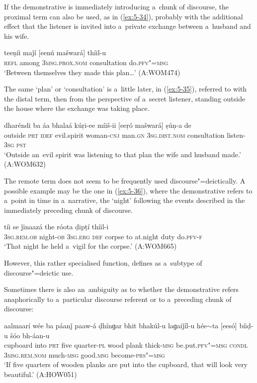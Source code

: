 If the demonstrative is immediately introducing a~chunk of discourse, the proximal term can also be used, as in (\ref{ex:5-34}), probably with the additional effect that the listener is invited into a~private exchange between a~husband and his wife.
\begin{exe}
\ex
\label{ex:5-34}
\gll teeṇíi maǰí [eenú mašwará] thíil-u \\
\textsc{refl} among \textsc{3msg}.\textsc{prox.nom} consultation do.\textsc{pfv"=msg}\\
\glt `Between themselves they made this plan{\ldots}' (A:WOM474)
\end{exe}
The same `plan' or `consultation' is a~little later, in (\ref{ex:5-35}), referred to with the distal term, then from the perspective of a~secret listener, standing outside the house where the exchange was taking place.
\begin{exe}
\ex
\label{ex:5-35}
\gll dharéndi ba áa bhalaá kúṛi-ee míiš-ii [eeṛó mašwará] ṣúṇ-a de \\
outside \textsc{prt} \textsc{idef} evil.spirit woman-\textsc{cnj} man.\textsc{gn} \textsc{3sg.dist.nom} consultation listen-\textsc{3sg} \textsc{pst} \\
\glt `Outside an~evil spirit was listening to that plan the wife and husband made.' (A:WOM632)
\end{exe}
The remote term does not seem to be frequently used discourse"=deictically. A possible example may be the one in (\ref{ex:5-36}), where the demonstrative refers to a~point in time in a~narrative, the `night' following the events described in the immediately preceding chunk of discourse.
\begin{exe}
\ex
\label{ex:5-36}
 tíi se ǰinaazá the róota ḍipṭí thíil-i\\
\textsc{3sg.rem.ob} night-\textsc{ob} \textsc{3sg.erg} \textsc{def} corpse to at.night duty do.\textsc{pfv-f}\\
\glt `That night he held a~vigil for the corpse.' (A:WOM665)
\end{exe}
However, this rather specialised function, \citet[225]{himmelmann1996} defines as a~subtype of discourse"=deictic use.

Sometimes there is also an~ambiguity as to whether the demonstrative refers anaphorically to a~particular discourse referent or to a~preceding chunk of discourse:

\begin{exe}
\ex
\label{ex:5-37}
\gll aalmaarí wée ba páanǰ paaw-á ḍhínɡar bhit bhakúl-u laɡaiǰíl-u hée$\sim$ta [eesó] bíiḍ-u šóo bh-áan-u \\
cupboard into \textsc{prt} five quarter-\textsc{pl} wood plank thick-\textsc{msg} be.put.\textsc{pfv"=msg} \textsc{condl} \textsc{3msg.rem.nom} much-\textsc{msg} good.\textsc{msg} become-\textsc{prs"=msg}\\
\glt `If five quarters of wooden planks are put into the cupboard, that will look very beautiful.'
(A:HOW051)
\end{exe}

